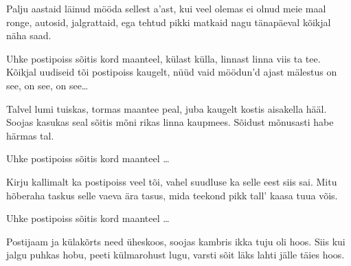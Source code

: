 Palju aastaid l\"ainud m\"o\"oda sellest a'ast,
kui veel olemas ei olnud meie maal
ronge, autosid, jalgrattaid,
ega tehtud pikki matkaid
nagu t\"anap\"aeval k\~oikjal n\"{a}ha saad.

Uhke postipoiss s\~oitis kord maanteel,
k\"ulast k\"ulla, linnast linna viis ta tee.
K\~oikjal uudiseid t\~oi postipoiss kaugelt,
n\"u\"ud vaid m\"o\"odun'd ajast m\"alestus on see,
on see, on see\ldots

Talvel lumi tuiskas, tormas maantee peal,
juba kaugelt kostis aisakella h\"a\"al.
Soojas kasukas seal s\~oitis
m\~oni rikas linna kaupmees.
S\~oidust m\~onusasti habe h\"armas tal.

Uhke postipoiss s\~oitis kord maanteel \ldots

Kirju kallimalt ka postipoiss veel t\~oi,
vahel suudluse ka selle eest siis sai.
Mitu h\~oberaha taskus
selle vaeva \"ara tasus,
mida teekond pikk tall' kaasa tuua v\~ois.

Uhke postipoiss s\~oitis kord maanteel \ldots

Postijaam ja k\"ulak\~orts need \"uheskoos,
soojas kambris ikka tuju oli hoos.
Siis kui jalgu puhkas hobu,
peeti k\"ulmarohust lugu,
varsti s\~oit l\"aks lahti j\"alle t\"aies hoos.
